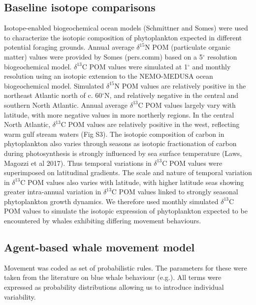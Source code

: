 \documentclass[a4paper,12pt]{article}
\begin{document}
\subsection{Baseline isotope comparisons}
Isotope-enabled biogeochemical ocean models\cite{magozzi2017using} (Schmittner and Somes) were used to characterize the isotopic composition of phytoplankton expected in different potential foraging grounds. 
Annual average $\delta^{15}$N POM (particulate organic matter) values were provided by Somes (pers.comm) based on a 5$^{\circ}$ resolution biogeochemical model. 
$\delta^{13}$C POM values were simulated at 1$^{\circ}$ and monthly resolution using an isotopic extension to the NEMO-MEDUSA ocean biogeochemical model\cite{magozzi2017using,yool2013medusa}. 
Simulated  $\delta^{15}$N POM values are relatively positive in the northeast Atlantic north of c. 60$^{\circ}$N, and relatively negative in the central and southern North Atlantic. 
Annual average $\delta^{13}$C POM values largely vary with latitude, with more negative values in more northerly regions. 
In the central North Atlantic, $\delta^{13}$C POM values are relatively positive in the west, reflecting warm gulf stream waters (Fig S3). 
The isotopic composition of carbon in phytoplankton also varies through seasons as isotopic fractionation of carbon during photosynthesis is strongly influenced by sea surface temperature (Laws, Magozzi et al 2017). 
Thus temporal variations in $\delta^{13}$C POM values were superimposed on latitudinal gradients. 
The scale and nature of temporal variation in $\delta^{13}$C POM values also varies with latitude, with higher latitude seas showing greater intra-annual variation in $\delta^{13}$C POM values linked to strongly seasonal phytoplankton growth dynamics. 
We therefore used monthly simulated $\delta^{13}$C POM values to simulate the isotopic expression of phytoplankton expected to be encountered by whales exhibiting differing movement behaviours.
 
\subsection{Agent-based whale movement model}
Movement was coded as set of probabilistic rules. 
The parameters for these were taken from the literature on blue whale behaviour (e.g.\cite{handbook}). 
All terms were expressed as probability distributions allowing us to introduce individual variability. 
 
\end{document}
